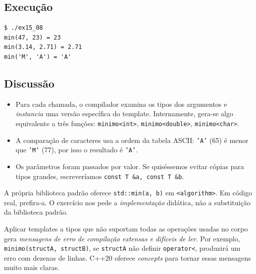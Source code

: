 \documentclass[11pt,a4paper]{article}
\begin{document}


\subsection*{Execu\c{c}\~ao}

\begin{saidabox}
\begin{lstlisting}[style=terminal]
$ ./ex15_08
min(47, 23) = 23
min(3.14, 2.71) = 2.71
min('M', 'A') = 'A'
\end{lstlisting}
\end{saidabox}

\subsection*{Discuss\~ao}

\begin{itemize}[leftmargin=*,itemsep=0pt]
  \item Para cada chamada, o compilador examina os tipos dos argumentos e \emph{instancia} uma vers\~ao espec\'ifica do template. Internamente, gera-se algo equivalente a tr\^es fun\c{c}\~oes: \texttt{minimo<int>}, \texttt{minimo<double>}, \texttt{minimo<char>}.
  \item A compara\c{c}\~ao de caracteres usa a ordem da tabela ASCII: \texttt{'A'} (65) \'e menor que \texttt{'M'} (77), por isso o resultado \'e \texttt{'A'}.
  \item Os par\^ametros foram passados por valor. Se quis\'essemos evitar c\'opias para tipos grandes, escrever\'iamos \texttt{const T \&a, const T \&b}.
\end{itemize}

\begin{boaprat}
A pr\'opria biblioteca padr\~ao oferece \texttt{std::min(a, b)} em \texttt{<algorithm>}. Em c\'odigo real, prefira-a. O exerc\'icio nos pede a \emph{implementa\c{c}\~ao} did\'atica, n\~ao a substitui\c{c}\~ao da biblioteca padr\~ao.
\end{boaprat}

\begin{errocomum}
Aplicar templates a tipos que n\~ao suportam todas as opera\c{c}\~oes usadas no corpo gera \emph{mensagens de erro de compila\c{c}\~ao extensas e dif\'iceis de ler}. Por exemplo, \texttt{minimo(structA, structB)}, se \texttt{structA} n\~ao definir \texttt{operator<}, produzir\'a um erro com dezenas de linhas. C++20 oferece \emph{concepts} para tornar essas mensagens muito mais claras.
\end{errocomum}
\end{document}
